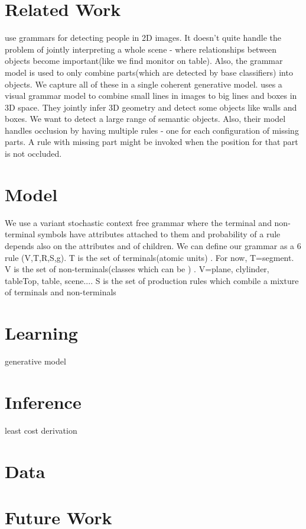 \documentclass[11pt]{article} %
\begin{document}
\section{Related Work}
\cite{girshick2011object} use grammars for detecting people in 2D images. It doesn't quite handle the problem of jointly interpreting a whole scene - where relationships between objects become important(like we find monitor on table). Also, the grammar model is used to only combine parts(which are detected by base classifiers) into objects. We capture all of these in a single coherent generative model.
\cite{zhu2011} uses a visual grammar model to combine small lines in images to big lines and boxes in 3D space. They jointly infer 3D geometry and detect some objects like walls and boxes. We want to detect a large range of semantic objects. Also, their model handles occlusion by having multiple rules - one for each configuration of missing parts. A rule with missing part might be invoked when the position for that part is not occluded.
\section{Model}
We use a variant stochastic context free grammar where the terminal and non-terminal symbols have attributes attached to them and probability of a rule depends also on the attributes and of children. We can define our grammar as a 6 rule (V,T,R,S,g). T is the set of terminals(atomic units) . For now, T={segment}. V is the set of non-terminals(classes which can be ) . V={plane, clylinder, tableTop, table, scene...}. S is the set of production rules which combile a mixture of terminals and non-terminals 

\section{Learning}
 generative model
\section{Inference}
least cost derivation

\section{Data}
\section{Future Work}

{  


}
\end{document}
